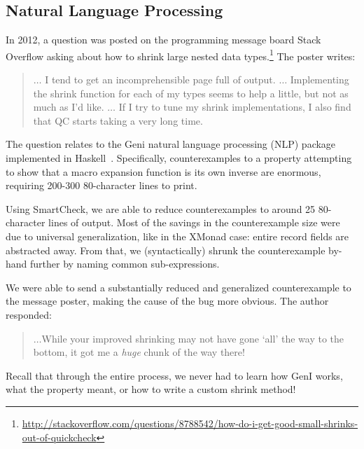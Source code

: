 \documentclass{sigplanconf}
\newcommand{\ttp}[1]{\texttt{#1}}
\begin{document}

\subsection{Natural Language Processing}
In 2012, a question was posted on the programming message board
Stack Overflow asking about how to shrink large nested data
types.\footnote{\url{http://stackoverflow.com/questions/8788542/how-do-i-get-good-small-shrinks-out-of-quickcheck}}
The poster writes:
\begin{quote}
$\ldots$ I tend to get an incomprehensible page full of output. $\ldots$
  Implementing the shrink function for each of my types seems to help a little,
  but not as much as I'd like.  $\ldots$ If I try to tune my shrink
  implementations, I also find that QC starts taking a very long time.
\end{quote}


\noindent
The question relates to the Geni natural language processing (NLP) package
implemented in Haskell~\cite{kow}.  Specifically, counterexamples to a property
attempting to show that a macro expansion function is its own inverse are
enormous, requiring 200-300 80-character lines to print.

Using SmartCheck, we are able to reduce counterexamples to around 25
80-character lines of output.  Most of the savings in the counterexample size
were due to universal generalization, like in the XMonad case: entire record
fields are abstracted away.  From that, we (syntactically) shrunk the
counterexample by-hand further by naming common sub-expressions.

We were able to send a substantially reduced and generalized counterexample to
the message poster, making the cause of the bug more obvious.  The author responded:
\begin{quote}
$\ldots$While your improved shrinking may not have gone `all'
the way to the bottom, it got me a \emph{huge} chunk of the way there!
\end{quote}

\noindent
Recall that through the entire process, we never had to learn how GenI works,
what the property meant, or how to write a custom shrink method!
\end{document}
